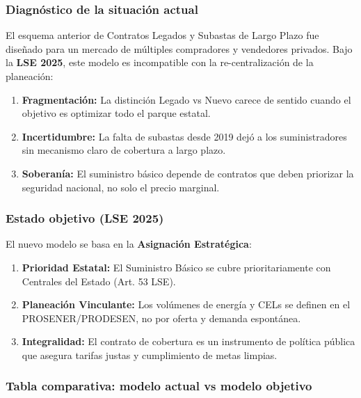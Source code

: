 \documentclass{cel}
\begin{document}
\subsubsection{Diagnóstico de la situación actual}
\nopagebreak

El esquema anterior de \textquotedbl{}Contratos Legados\textquotedbl{} y \textquotedbl{}Subastas de Largo Plazo\textquotedbl{} fue diseñado para un mercado de múltiples compradores y vendedores privados. Bajo la \textbf{LSE 2025}, este modelo es incompatible con la re-centralización de la planeación:


\begin{enumerate}
\item \textbf{Fragmentación:} La distinción \textquotedbl{}Legado\textquotedbl{} vs \textquotedbl{}Nuevo\textquotedbl{} carece de sentido cuando el objetivo es optimizar todo el parque estatal.
\item \textbf{Incertidumbre:} La falta de subastas desde 2019 dejó a los suministradores sin mecanismo claro de cobertura a largo plazo.
\item \textbf{Soberanía:} El suministro básico depende de contratos que deben priorizar la seguridad nacional, no solo el precio marginal.

\end{enumerate}
\subsubsection{Estado objetivo (LSE 2025)}
\nopagebreak

El nuevo modelo se basa en la \textbf{Asignación Estratégica}:


\begin{enumerate}
\item \textbf{Prioridad Estatal:} El Suministro Básico se cubre prioritariamente con Centrales del Estado (Art. 53 LSE).
\item \textbf{Planeación Vinculante:} Los volúmenes de energía y CELs se definen en el PROSENER/PRODESEN, no por \textquotedbl{}oferta y demanda\textquotedbl{} espontánea.
\item \textbf{Integralidad:} El contrato de cobertura es un instrumento de política pública que asegura tarifas justas y cumplimiento de metas limpias.

\end{enumerate}
\vspace{0.4cm}
\subsubsection{Tabla comparativa: modelo actual vs modelo objetivo}
\nopagebreak
\end{document}
